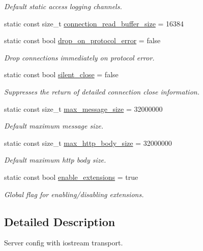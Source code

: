 \begin{DoxyCompactItemize}
\begin{DoxyCompactList}\small\item\em Default static access logging channels. \end{DoxyCompactList}\item 
static const size\+\_\+t \hyperlink{structwebsocketpp_1_1config_1_1core_af1f28eec2b5e12b6d7cccb0c87835119}{connection\+\_\+read\+\_\+buffer\+\_\+size} = 16384
\item 
static const bool \hyperlink{structwebsocketpp_1_1config_1_1core_aa103c2e42ba4c43a34e918048b478890}{drop\+\_\+on\+\_\+protocol\+\_\+error} = false
\begin{DoxyCompactList}\small\item\em Drop connections immediately on protocol error. \end{DoxyCompactList}\item 
static const bool \hyperlink{structwebsocketpp_1_1config_1_1core_acb5ef1d40ae50ab2443837270d715f53}{silent\+\_\+close} = false
\begin{DoxyCompactList}\small\item\em Suppresses the return of detailed connection close information. \end{DoxyCompactList}\item 
static const size\+\_\+t \hyperlink{structwebsocketpp_1_1config_1_1core_a54875ed41a1d11149c684f9467b2e0d5}{max\+\_\+message\+\_\+size} = 32000000
\begin{DoxyCompactList}\small\item\em Default maximum message size. \end{DoxyCompactList}\item 
static const size\+\_\+t \hyperlink{structwebsocketpp_1_1config_1_1core_a4836b30dbc83db465f44aabae4e8ef55}{max\+\_\+http\+\_\+body\+\_\+size} = 32000000
\begin{DoxyCompactList}\small\item\em Default maximum http body size. \end{DoxyCompactList}\item 
static const bool \hyperlink{structwebsocketpp_1_1config_1_1core_af2944a777c23010137c55fdfcfb8c352}{enable\+\_\+extensions} = true
\begin{DoxyCompactList}\small\item\em Global flag for enabling/disabling extensions. \end{DoxyCompactList}\end{DoxyCompactItemize}


\subsection{Detailed Description}
Server config with iostream transport. 

